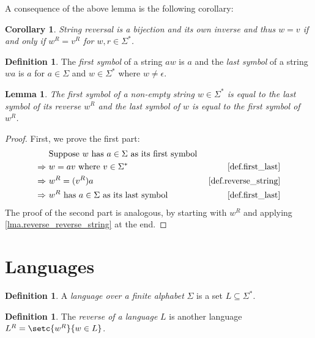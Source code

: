 \documentclass{report}
\newtheorem{lemma}[theorem]{Lemma}
\newtheorem{corollary}[theorem]{Corollary}
\theoremstyle{definition}
\newtheorem{definition}[theorem]{Definition}
\begin{document}
\begin{appendices}
A consequence of the above lemma is the following corollary:

\begin{corollary} \label{crl.reverse_string_bijection}
String reversal is a bijection and its own inverse and thus $w = v$ if and only if
$w^R = v^R$ for $w, r \in \Sigma^{\ast}$.
\end{corollary}

\begin{definition} \label{def.first_last}
The \emph{first symbol} of a string $aw$ is $a$ and the
\emph{last symbol} of a string $wa$ is $a$ for $a \in \Sigma$ and
$w \in \Sigma^{\ast}$ where $w \neq \epsilon$.
\end{definition}

\begin{lemma} \label{lma.first_last_reverse}
The first symbol of a non-empty string $w \in \Sigma^{\ast}$ is equal to the last
symbol of its reverse $w^R$ and the last symbol of $w$ is equal to the first symbol
of $w^R$.
\end{lemma}

\begin{proof}
First, we prove the first part:
\begin{align*}
& \text{Suppose } w \text{ has } a \in \Sigma \text{ as its first symbol } \\
\Rightarrow \ & w = av \text{ where } v \in \Sigma^{\ast}
& \text{\cref{def.first_last}} \\
\Rightarrow \ & w^R = (v^R) a
& \text{\cref{def.reverse_string}} \\
\Rightarrow \ & w^R \text{ has } a \in \Sigma \text{ as its last symbol }
& \text{\cref{def.first_last}}
\end{align*}
The proof of the second part is analogous, by starting with $w^R$
and applying \cref{lma.reverse_reverse_string} at the end.
\end{proof}

\section{Languages}

\begin{definition}
A \emph{language over a finite alphabet} $\Sigma$ is a set
$L \subseteq \Sigma^{\ast}$. 
\end{definition}

\begin{definition} \label{def.reverse_language}
The \emph{reverse of a language} $L$ is another language
$L^R = \setc{w^R}{w \in L}$.
\end{definition}


\end{appendices}
\end{document}
